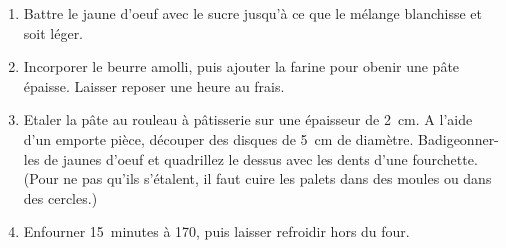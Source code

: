 
\begin{ingredients}
\end{ingredients}


\begin{recipe}
  \begin{enumerate}

  \item Battre le jaune d'oeuf avec le sucre jusqu'\`a ce que le
    m\'elange blanchisse et soit l\'eger.

  \item Incorporer le beurre amolli, puis ajouter la farine pour obenir
    une p\^ate \'epaisse.  Laisser reposer une heure au frais.

  \item Etaler la p\^ate au rouleau \`a p\^atisserie sur une
    \'epaisseur de 2~cm.  A l'aide d'un emporte pi\`ece, d\'ecouper
    des disques de 5~cm de diam\`etre.  Badigeonner-les de jaunes
    d'oeuf et quadrillez le dessus avec les dents d'une fourchette.
    (Pour ne pas qu'ils s'\'etalent, il faut cuire les palets dans des
    moules ou dans des cercles.)

  \item Enfourner 15~minutes \`a 170\degreeC, puis laisser refroidir hors du
    four.

  \end{enumerate}
\end{recipe}
